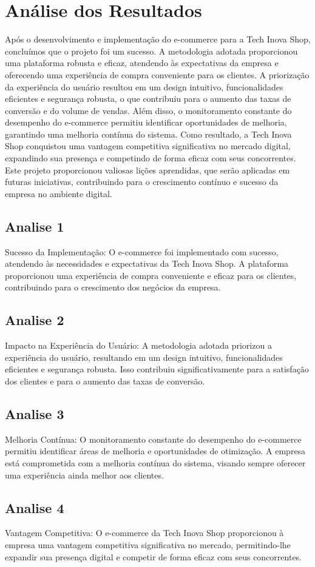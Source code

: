 \chapter{Análise dos Resultados}
\label{ch:resultados}
Após o desenvolvimento e implementação do e-commerce para a Tech Inova Shop, concluímos que o projeto foi um sucesso. A metodologia adotada proporcionou uma plataforma robusta e eficaz, atendendo às expectativas da empresa e oferecendo uma experiência de compra conveniente para os clientes. A priorização da experiência do usuário resultou em um design intuitivo, funcionalidades eficientes e segurança robusta, o que contribuiu para o aumento das taxas de conversão e do volume de vendas. Além disso, o monitoramento constante do desempenho do e-commerce permitiu identificar oportunidades de melhoria, garantindo uma melhoria contínua do sistema. Como resultado, a Tech Inova Shop conquistou uma vantagem competitiva significativa no mercado digital, expandindo sua presença e competindo de forma eficaz com seus concorrentes. Este projeto proporcionou valiosas lições aprendidas, que serão aplicadas em futuras iniciativas, contribuindo para o crescimento contínuo e sucesso da empresa no ambiente digital.
\section{Analise 1}
Sucesso da Implementação: O e-commerce foi implementado com sucesso, atendendo às necessidades e expectativas da Tech Inova Shop. A plataforma proporcionou uma experiência de compra conveniente e eficaz para os clientes, contribuindo para o crescimento dos negócios da empresa.
\section{Analise 2}
Impacto na Experiência do Usuário: A metodologia adotada priorizou a experiência do usuário, resultando em um design intuitivo, funcionalidades eficientes e segurança robusta. Isso contribuiu significativamente para a satisfação dos clientes e para o aumento das taxas de conversão.
\section{Analise 3}
Melhoria Contínua: O monitoramento constante do desempenho do e-commerce permitiu identificar áreas de melhoria e oportunidades de otimização. A empresa está comprometida com a melhoria contínua do sistema, visando sempre oferecer uma experiência ainda melhor aos clientes.
\section{Analise 4}
Vantagem Competitiva: O e-commerce da Tech Inova Shop proporcionou à empresa uma vantagem competitiva significativa no mercado, permitindo-lhe expandir sua presença digital e competir de forma eficaz com seus concorrentes.

